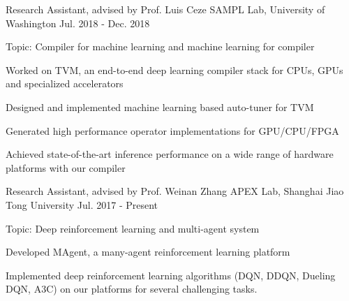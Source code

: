 

\begin{cventries}

\cventry
	{Research Assistant, advised by Prof. Luis Ceze} %
	{SAMPL Lab, University of Washington} %
	{Jul. 2018 - Dec. 2018} %
	{} %
	{
		\begin{cvitems} %
			\item{Topic: Compiler for machine learning and machine learning for compiler}
			\item {Worked on TVM, an end-to-end deep learning compiler stack for CPUs, GPUs and specialized accelerators
			}
			\item {Designed and implemented machine learning based auto-tuner for TVM}
			\item {Generated high performance operator implementations for GPU/CPU/FPGA}
			\item {Achieved state-of-the-art inference performance on a wide range of hardware platforms with our compiler}
		\end{cvitems}
}
  \cventry
    {Research Assistant, advised by Prof. Weinan Zhang} %
    {APEX Lab, Shanghai Jiao Tong University} %
    {Jul. 2017 - Present} %
    {} %
    {
      \begin{cvitems} %
      \item{Topic: Deep reinforcement learning and multi-agent system}
      \item {Developed MAgent, a many-agent reinforcement learning platform}
      \item {Implemented deep reinforcement learning algorithms (DQN, DDQN, Dueling DQN, A3C) on our platforms for several challenging tasks.}
      \end{cvitems}
    }
\end{cventries}

